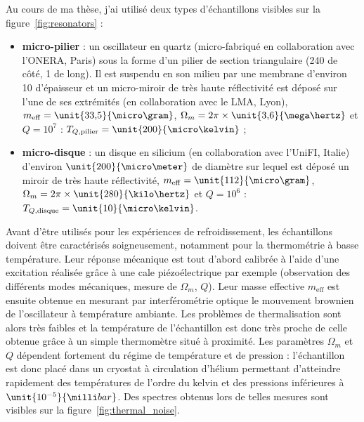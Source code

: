 \documentclass[12pt,a4paper]{article}
\begin{document}
Au cours de ma thèse, j'ai utilisé deux types d'échantillons visibles sur la figure~\ref{fig:resonators} :
\begin{itemize}
\item \textbf{micro-pilier} : un oscillateur en quartz (micro-fabriqué en collaboration avec l'ONERA, Paris) sous la forme d'un pilier de section triangulaire (\unit{240}{\micro\meter} de côté, \unit{1}{\milli\meter} de long).
Il est suspendu en son milieu par une membrane d'environ \unit{10}{\micro\meter} d'épaisseur et un micro-miroir de très haute réflectivité est déposé sur l'une de ses extrémités (en collaboration avec le LMA, Lyon), $m_\mathrm{eff}=\unit{33{,}5}{\micro\gram}$, $\Omega_m=2\pi\times\unit{3{,}6}{\mega\hertz}$ et $Q=10^7$ : $T_{Q,\mathrm{pilier}} = \unit{200}{\micro\kelvin}$ ;
\item \textbf{micro-disque} : un disque en silicium (en collaboration avec l'UniFI, Italie) d'environ $\unit{200}{\micro\meter}$ de diamètre sur lequel est déposé un miroir de très haute réflectivité, $m_\mathrm{eff}=\unit{112}{\micro\gram}$, $\Omega_m=2\pi\times\unit{280}{\kilo\hertz}$ et $Q=10^6$ : $T_{Q,\mathrm{disque}} = \unit{10}{\micro\kelvin}$.
\end{itemize}
Avant d'être utilisés pour les expériences de refroidissement, les échantillons doivent être caractérisés soigneusement, notamment pour la thermométrie à basse température.
Leur réponse mécanique est tout d'abord calibrée à l'aide d'une excitation réalisée grâce à une cale piézoélectrique par exemple (observation des différents modes mécaniques, mesure de $\Omega_m$, $Q$).
Leur masse effective $m_\mathrm{eff}$ est ensuite obtenue en mesurant par interférométrie optique le mouvement brownien de l'oscillateur à température ambiante.
Les problèmes de thermalisation sont alors très faibles et la température de l'échantillon est donc très proche de celle obtenue grâce à un simple thermomètre situé à proximité.
Les paramètres $\Omega_m$ et $Q$ dépendent fortement du régime de température et de pression  : l'échantillon est donc placé dans un cryostat à circulation d'hélium permettant d'atteindre rapidement des températures de l'ordre du kelvin et des pressions inférieures à $\unit{10^{-5}}{\milli bar}$.
Des spectres obtenus lors de telles mesures sont visibles sur la figure~\ref{fig:thermal_noise}.
\end{document}
